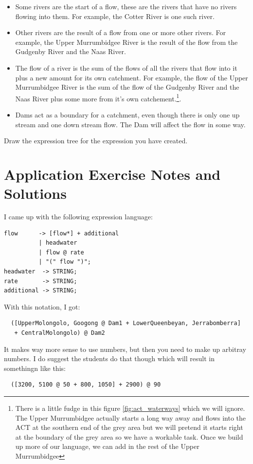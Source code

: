 \documentclass[twoside=false, DIV=14]{scrartcl}
\begin{document}
\begin{itemize}
  \item Some rivers are the start of a flow, these are the rivers that have no rivers flowing into them.  For example, the Cotter River is one such river.
  \item Other rivers are the result of a flow from one or more other rivers.  For example, the Upper Murrumbidgee River is the result of the flow from the Gudgenby River and the Naas River.
  \item The flow of a river is the sum of the flows of all the rivers that flow into it plus a new amount for its own catchment.  For example, the flow of the Upper Murrumbidgee River is the sum of the flow of the Gudgenby River and the Naas River plus some more from it's own catchement.\footnote{ There is a little fudge in this figure \ref{fig:act_waterways} which we will ignore.  The Upper Murrumbidgee actually starts a long way away and flows into the ACT at the southern end of the grey area but we will pretend it starts right at the boundary of the grey area so we have a workable task.  Once we build up more of our language, we can add in the rest of the Upper Murrumbidgee}.
  \item Dams act as a boundary for a catchment, even though there is only one up stream and one down stream flow.  The Dam will affect the flow in some way.
\end{itemize}

Draw the expression tree for the expression you have created.

\newpage
\part*{Application Exercise Notes and Solutions}
I came up with the following expression language:
\begin{lstlisting}
flow      -> [flow*] + additional  
          | headwater 
          | flow @ rate
          | "(" flow ")";
headwater  -> STRING;
rate       -> STRING;
additional -> STRING;
\end{lstlisting}

With this notation, I got:
\begin{lstlisting}
  ([UpperMolongolo, Googong @ Dam1 + LowerQueenbeyan, Jerrabomberra]
   + CentralMolongolo) @ Dam2
\end{lstlisting}

It makes way more sense to use numbers, but then you need to make up arbitray numbers.  I do suggest the students do that though which will result in somethingn like this:
\begin{lstlisting}
  ([3200, 5100 @ 50 + 800, 1050] + 2900) @ 90
\end{lstlisting}
\end{document}
